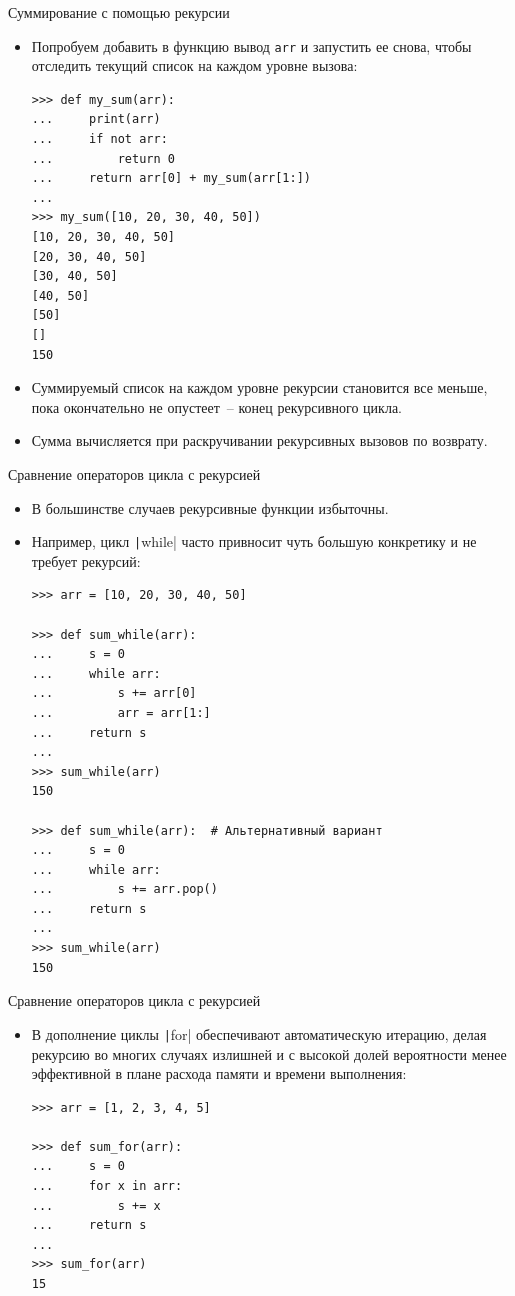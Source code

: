 \documentclass[aspectratio=169]{beamer}%
\begin{document}
\begin{frame}[fragile]{Суммирование с помощью рекурсии}
\scriptsize
\begin{itemize}
\item Попробуем добавить в функцию вывод \texttt{arr} и запустить ее снова, чтобы отследить текущий список на каждом уровне вызова:

\begin{verbatim}
>>> def my_sum(arr):
...     print(arr)
...     if not arr:
...         return 0
...     return arr[0] + my_sum(arr[1:])
...
>>> my_sum([10, 20, 30, 40, 50])
[10, 20, 30, 40, 50]
[20, 30, 40, 50]
[30, 40, 50]
[40, 50]
[50]
[]
150
\end{verbatim}

\item Суммируемый список на каждом уровне рекурсии становится все меньше, пока окончательно не опустеет~-- конец рекурсивного цикла. 
\item Сумма вычисляется при раскручивании рекурсивных вызовов по возврату.
\end{itemize}
\vfill
\end{frame}


\begin{frame}[fragile]{Сравнение операторов цикла с рекурсией}
\scriptsize
\begin{itemize}
\item В большинстве случаев рекурсивные функции избыточны.
\item Например, цикл \texttt|while| часто привносит чуть большую конкретику и не требует рекурсий:

\begin{verbatim}
>>> arr = [10, 20, 30, 40, 50]

>>> def sum_while(arr):
...     s = 0
...     while arr:
...         s += arr[0]
...         arr = arr[1:]
...     return s
...
>>> sum_while(arr)
150

>>> def sum_while(arr):  # Альтернативный вариант
...     s = 0
...     while arr:
...         s += arr.pop()
...     return s
...
>>> sum_while(arr)
150
\end{verbatim}
\end{itemize}
\vfill
\end{frame}


\begin{frame}[fragile]{Сравнение операторов цикла с рекурсией}
\scriptsize
\begin{itemize}
\item В дополнение циклы \texttt|for| обеспечивают автоматическую итерацию, делая рекурсию во многих случаях излишней и с высокой долей вероятности менее эффективной в плане расхода памяти и времени выполнения:

\begin{verbatim}
>>> arr = [1, 2, 3, 4, 5]

>>> def sum_for(arr):
...     s = 0
...     for x in arr:
...         s += x
...     return s
...
>>> sum_for(arr)
15
\end{verbatim}
\end{itemize}
\vfill
\end{frame}
\end{document}
